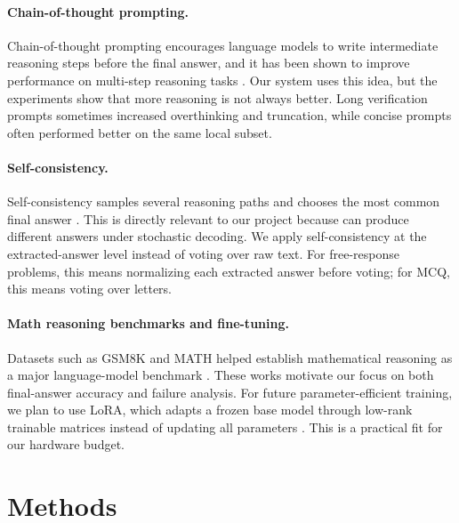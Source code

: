 \documentclass{article}
\begin{document}
\paragraph{Chain-of-thought prompting.}
Chain-of-thought prompting encourages language models to write intermediate reasoning steps before the final answer, and it has been shown to improve performance on multi-step reasoning tasks \citep{wei2022chain}. Our system uses this idea, but the experiments show that more reasoning is not always better. Long verification prompts sometimes increased overthinking and truncation, while concise prompts often performed better on the same local subset.

\paragraph{Self-consistency.}
Self-consistency samples several reasoning paths and chooses the most common final answer \citep{wang2023selfconsistency}. This is directly relevant to our project because  can produce different answers under stochastic decoding. We apply self-consistency at the extracted-answer level instead of voting over raw text. For free-response problems, this means normalizing each extracted answer before voting; for MCQ, this means voting over letters.

\paragraph{Math reasoning benchmarks and fine-tuning.}
Datasets such as GSM8K and MATH helped establish mathematical reasoning as a major language-model benchmark \citep{cobbe2021training,hendrycks2021measuring}. These works motivate our focus on both final-answer accuracy and failure analysis. For future parameter-efficient training, we plan to use LoRA, which adapts a frozen base model through low-rank trainable matrices instead of updating all parameters \citep{hu2022lora}. This is a practical fit for our hardware budget.
\section{Methods}
\label{sec:methods}
\end{document}
